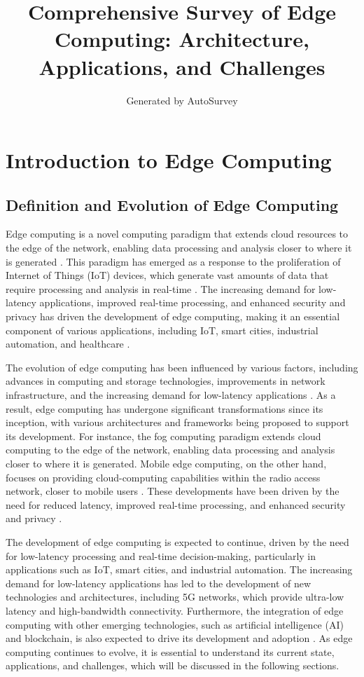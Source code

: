 \documentclass[11pt]{article}
\title{Comprehensive Survey of Edge Computing: Architecture, Applications, and Challenges}
\author{Generated by AutoSurvey}
\date{}
\begin{document}
\maketitle
\tableofcontents
\newpage

\section{Introduction to Edge Computing}

\subsection{Definition and Evolution of Edge Computing}

Edge computing is a novel computing paradigm that extends cloud resources to the edge of the network, enabling data processing and analysis closer to where it is generated \cite{ref1}. This paradigm has emerged as a response to the proliferation of Internet of Things (IoT) devices, which generate vast amounts of data that require processing and analysis in real-time \cite{ref2}. The increasing demand for low-latency applications, improved real-time processing, and enhanced security and privacy has driven the development of edge computing, making it an essential component of various applications, including IoT, smart cities, industrial automation, and healthcare \cite{ref3}.

The evolution of edge computing has been influenced by various factors, including advances in computing and storage technologies, improvements in network infrastructure, and the increasing demand for low-latency applications \cite{ref4}. As a result, edge computing has undergone significant transformations since its inception, with various architectures and frameworks being proposed to support its development. For instance, the fog computing paradigm extends cloud computing to the edge of the network, enabling data processing and analysis closer to where it is generated. Mobile edge computing, on the other hand, focuses on providing cloud-computing capabilities within the radio access network, closer to mobile users \cite{ref4}. These developments have been driven by the need for reduced latency, improved real-time processing, and enhanced security and privacy \cite{ref5}.

The development of edge computing is expected to continue, driven by the need for low-latency processing and real-time decision-making, particularly in applications such as IoT, smart cities, and industrial automation. The increasing demand for low-latency applications has led to the development of new technologies and architectures, including 5G networks, which provide ultra-low latency and high-bandwidth connectivity. Furthermore, the integration of edge computing with other emerging technologies, such as artificial intelligence (AI) and blockchain, is also expected to drive its development and adoption \cite{ref6}. As edge computing continues to evolve, it is essential to understand its current state, applications, and challenges, which will be discussed in the following sections.
\end{document}
